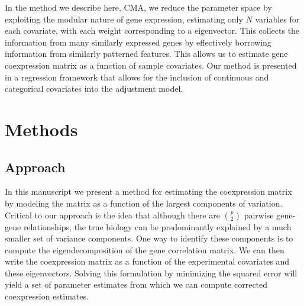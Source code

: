 In the method we describe here, CMA, we reduce the parameter
space by exploiting the modular nature of gene expression, estimating
only $N$ variables for each covariate, with each weight corresponding
to a eigenvector. This collects the information from many similarly
expressed genes by effectively borrowing information from similarly
patterned features. This allows us to estimate gene coexpression matrix
as a function of sample covariates. Our method is presented in a regression
framework that allows for the inclusion of continuous and categorical
covariates into the adjustment model.

\section{Methods}

\subsection{Approach}

In this manuscript we present a method for estimating the coexpression
matrix by modeling the matrix as a function of the largest components
of variation. Critical to our approach is the idea that although there
are $\binom{p}{2}$ pairwise gene-gene relationships, the true biology
can be predominantly explained by a much smaller set of variance components.
One way to identify these components is to compute the eigendecomposition
of the gene correlation matrix. We can then write the coexpression
matrix as a function of the experimental covariates and these eigenvectors.
Solving this formulation by minimizing the squared error will yield
a set of parameter estimates from which we can compute corrected coexpression
estimates.

